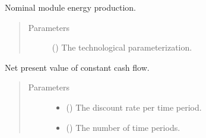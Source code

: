 \documentclass[letterpaper,10pt,english]{sphinxmanual}
\begin{document}

\begin{fulllineitems}
\label{\detokenize{technology:technology.pv_residential_large.module_power}}
Nominal module energy production.
\begin{quote}\begin{description}
\item[{Parameters}] \leavevmode
{} () \textendash{} The technological parameterization.

\end{description}\end{quote}

\end{fulllineitems}


\begin{fulllineitems}
\label{\detokenize{technology:technology.pv_residential_large.npv}}
Net present value of constant cash flow.
\begin{quote}\begin{description}
\item[{Parameters}] \leavevmode\begin{itemize}
\item {} 
 () \textendash{} The discount rate per time period.

\item {} 
 () \textendash{} The number of time periods.

\end{itemize}

\end{description}\end{quote}

\end{fulllineitems}
\end{document}
